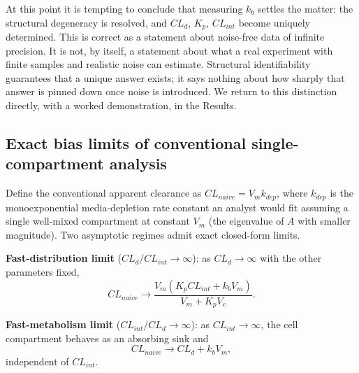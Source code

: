 At this point it is tempting to conclude that measuring $k_b$ settles the matter: the structural degeneracy is resolved, and $CL_d$, $K_p$, $CL_{int}$ become uniquely determined. This is correct as a statement about noise-free data of infinite precision. It is not, by itself, a statement about what a real experiment with finite samples and realistic noise can estimate. Structural identifiability guarantees that a unique answer exists; it says nothing about how sharply that answer is pinned down once noise is introduced. We return to this distinction directly, with a worked demonstration, in the Results.

\subsection*{Exact bias limits of conventional single-compartment analysis}

Define the conventional apparent clearance as $CL_{naive} = V_m k_{dep}$, where $k_{dep}$ is the monoexponential media-depletion rate constant an analyst would fit assuming a single well-mixed compartment at constant $V_m$ (the eigenvalue of $A$ with smaller magnitude). Two asymptotic regimes admit exact closed-form limits.

\textbf{Fast-distribution limit} ($CL_d/CL_{int}\to\infty$): as $CL_d\to\infty$ with the other parameters fixed,
\begin{equation}
CL_{naive} \to \frac{V_m(K_p CL_{int} + k_b V_m)}{V_m + K_p V_c}. \label{eq:fastdist}
\end{equation}

\textbf{Fast-metabolism limit} ($CL_{int}/CL_d\to\infty$): as $CL_{int}\to\infty$, the cell compartment behaves as an absorbing sink and
\begin{equation}
CL_{naive} \to CL_d + k_b V_m, \label{eq:fastmetab}
\end{equation}
independent of $CL_{int}$.

